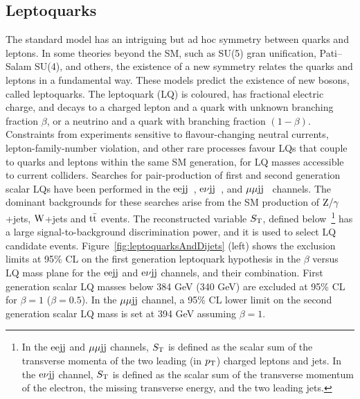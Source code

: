 \documentclass[11pt]{article}
\def\pt{\ensuremath{p_{\rm T}}\xspace}
\def\eejj{$\rm{eejj}$\xspace}
\def\mumujj{$\mu\mu \rm{jj}$\xspace}
\def\enujj{$\rm{e}\nu \rm{jj}$\xspace}
\def\zjets{\ensuremath{\rm{Z}/\gamma}+jets\xspace}
\def\wjets{\ensuremath{\rm{W}}+jets\xspace}
\def\ttbar{\ensuremath{\rm{t} \bar{\rm{t}}}\xspace}
\def\ST{\ensuremath{S_{\rm T}}\xspace}
\begin{document}
\subsection{Leptoquarks}

The standard model has an intriguing but ad hoc symmetry between 
quarks and leptons. In some theories beyond the SM, such 
as SU(5) gran unification, Pati--Salam SU(4), and others, the existence of a new symmetry 
relates the quarks and leptons in a fundamental way. These models 
predict the existence of new bosons, called leptoquarks. 
The leptoquark (LQ) is coloured, has fractional electric charge, and 
decays to a charged lepton and a quark with unknown branching 
fraction $\beta$, or a neutrino and a quark with branching fraction 
$(1-\beta)$. Constraints from experiments sensitive to flavour-changing 
neutral currents, lepton-family-number violation, and other rare processes 
favour LQs that couple to quarks and leptons within the same SM generation, 
for LQ masses accessible to current colliders. 
Searches for pair-production of first and second 
generation scalar LQs have been performed in the \eejj~\cite{PhysRevLett.106.201802}, 
\enujj~\cite{Collaboration:2011ar}, and \mumujj~\cite{PhysRevLett.106.201803} channels. 
The dominant backgrounds for these searches arise from the SM production of 
\zjets, \wjets and \ttbar events. The reconstructed variable \ST, defined 
below~\footnote{In the \eejj and \mumujj channels, 
\ST is defined as the scalar sum of the transverse momenta of the two 
leading (in \pt) charged leptons and jets. In the \enujj channel, 
\ST is defined as the scalar sum of the transverse momentum of the electron, 
the missing transverse energy, and the two leading jets.} 
has a large signal-to-background discrimination power, 
and it is used to select LQ candidate events.
Figure~\ref{fig:leptoquarksAndDijets} (left) shows the exclusion limits at 95\% CL on 
the first generation leptoquark hypothesis in the $\beta$ versus LQ mass 
plane for the \eejj and \enujj channels, and their combination. 
First generation scalar LQ masses below 384 GeV (340 GeV) are excluded 
at 95\% CL for $\beta=1$ ($\beta=0.5$). In the \mumujj channel, a 95\% CL lower limit on 
the second generation scalar LQ mass is set at 394 GeV assuming $\beta=1$.
\end{document}
